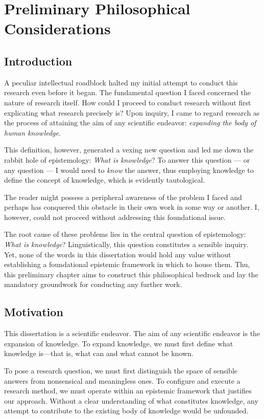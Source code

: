 \chapter*{Preliminary Philosophical Considerations}


\section*{Introduction}

A peculiar intellectual roadblock halted my initial attempt to conduct this research even before it began.
The fundamental question I faced concerned the nature of research itself.
How could I proceed to conduct research without first explicating what research precisely is?
Upon inquiry, I came to regard research as the process of attaining the aim of any scientific endeavor:
\textit{expanding the body of human knowledge}.

This definition, however, generated a vexing new question and led me down the rabbit hole of epistemology:
\textit{What is knowledge}?
To answer this question — or any question — I would need to \textit{know} the answer, thus employing knowledge to define the concept of knowledge, which is evidently tautological.

The reader might possess a peripheral awareness of the problem I faced and perhaps has conquered this obstacle in their own work in some way or another.
I, however, could not proceed without addressing this foundational issue.

The root cause of these problems lies in the central question of epistemology:
\textit{What is knowledge}?
Linguistically, this question constitutes a sensible inquiry.
Yet, none of the words in this dissertation would hold any value without establishing a foundational epistemic framework in which to house them.
Thu, this preliminary chapter aims to construct this philosophical bedrock and lay the mandatory groundwork for conducting any further work.


\section*{Motivation}

This dissertation is a scientific endeavor.
The aim of any scientific endeavor is the expansion of knowledge.
To expand knowledge, we must first define what knowledge is—that is, what can and what cannot be known.

To pose a research question, we must first distinguish the space of sensible answers from nonsensical and meaningless ones. To configure and execute a research method, we must operate within an epistemic framework that justifies our approach. Without a clear understanding of what constitutes knowledge, any attempt to contribute to the existing body of knowledge would be unfounded.

